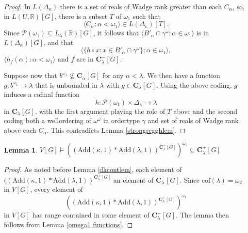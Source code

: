 \documentclass[12pt]{article}
\newtheorem{lemma}[theorem]{Lemma}
\def\bbC{{\mathbf{C}}}
\renewcommand{\models}{\vDash}
\newcommand{\powerset}{\mathcal{P}}
\newcommand{\Add}{\mathrm{Add}}
\newcommand{\bbR}{\mathbb{R}}
\newcommand{\breals}{\omega^{\omega}}
\newcommand{\cP}{\mathcal{P}}
\newcommand{\cof}{\mathrm{cof}}
\begin{document}
\begin{proof}
In $L(\Delta_{\kappa})$ there is a set of reals of Wadge rank greater than each $C_{\alpha}$, so, in $L(U, \bbR)[G]$,  there is a subset $T$ of $\omega_{1}$ such that
\[\langle C_\alpha : \alpha < \omega_{1} \rangle \in L(\Delta_\kappa)[T].\]
Since $\powerset(\omega_{1}) \subseteq L_{\lambda}(\bbR)[G]$,
it follows that $\langle B'_{\alpha} \cap \gamma^{\omega} : \alpha \in \omega_{1} \rangle$ is in $L(\Delta_{\kappa})[G]$, and that
\[\langle \{ h \circ x : x \in B'_{\alpha} \cap \gamma^{\omega}\} : \alpha \in \omega_{1} \rangle,\]
$\langle h_{f}(\alpha) : \alpha < \omega_{1} \rangle$ and $f$  are in $\bbC^{-}_{\lambda}[G]$.

Suppose now that $b^{\omega_1}\not \subseteq \bbC_{\alpha}[G]$ for any $\alpha < \lambda$.
We then have a function $g\colon b^{\omega_1}\to \lambda$ that is unbounded in $\lambda$ with
$g\in \bbC_{\lambda}[G]$.
Using the above coding, $g$ induces a cofinal function
\[h \colon \powerset(\omega_{1}) \times \Delta_{\kappa} \to \lambda\] in $\bbC_{\lambda}[G]$, with the first argument playing the role of $T$ above and the second coding both a wellordering of $\breals$ in ordertype $\gamma$ and set of reals of Wadge rank above each $C_{\alpha}$.
This contradicts Lemma \ref{strongregghlem}.
\end{proof}


\begin{lemma}\label{kaplamcllem} $V[G] \models ((\Add(\kappa, 1)*\Add(\lambda, 1))^{\bbC^{+}_{\lambda}[G]})^{\omega_{1}} \subseteq \bbC^{+}_{\lambda}[G]$
\end{lemma}

\begin{proof}
As noted before Lemma \ref{dkcontlem}, each element of $((\Add(\kappa, 1)*\Add(\lambda, 1))^{\bbC^{+}_{\lambda}[G]}$
an element of $\bbC^{-}_{\lambda}[G]$.
Since $\cof(\lambda) = \omega_{2}$ in $V[G]$, every element of
\[((\Add(\kappa, 1)*\Add(\lambda, 1))^{\bbC^{+}_{\lambda}[G]})^{\omega_{1}}\] in $V[G]$ has range contained in some element of $\bbC^{-}_{\lambda}[G]$. The lemma then follows from Lemma \ref{omega1 functions}.
\end{proof}
\end{document}
